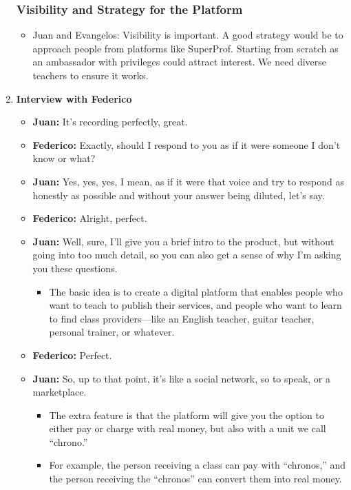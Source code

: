 \begin{enumerate}
    \subsubsection*{Visibility and Strategy for the Platform}
    \begin{itemize}
        \item Juan and Evangelos: Visibility is important.
        A good strategy would be to approach people from platforms like SuperProf.
        Starting from scratch as an ambassador with privileges could attract interest.
        We need diverse teachers to ensure it works.
    \end{itemize}
    \item \textbf{Interview with Federico}
    \begin{itemize}
        \item \textbf{Juan:} It's recording perfectly, great.
        \item \textbf{Federico:} Exactly, should I respond to you as if it were someone I don't know or what?
        \item \textbf{Juan:} Yes, yes, yes, I mean, as if it were that voice and try to respond as honestly as possible and without your answer being diluted, let's say.
        \item \textbf{Federico:} Alright, perfect.
        \item \textbf{Juan:} Well, sure, I'll give you a brief intro to the product, but without going into too much detail, so you can also get a sense of why I'm asking you these questions.
        \begin{itemize}
            \item The basic idea is to create a digital platform that enables people who want to teach to publish their services, and people who want to learn to find class providers—like an English teacher, guitar teacher, personal trainer, or whatever.
        \end{itemize}
        \item \textbf{Federico:} Perfect.
        \item \textbf{Juan:} So, up to that point, it's like a social network, so to speak, or a marketplace.
        \begin{itemize}
            \item The extra feature is that the platform will give you the option to either pay or charge with real money, but also with a unit we call ``chrono.''
            \item For example, the person receiving a class can pay with ``chronos,'' and the person receiving the ``chronos'' can convert them into real money.

\end{itemize}
\end{itemize}
\end{enumerate}
